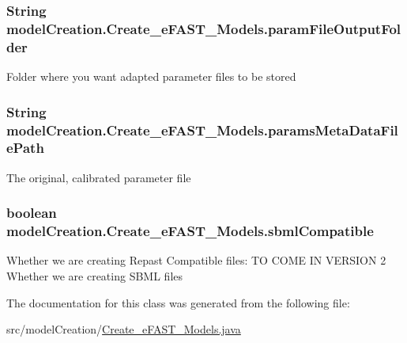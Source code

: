 \subsubsection[{param\+File\+Output\+Folder}]{\setlength{\rightskip}{0pt plus 5cm}String model\+Creation.\+Create\+\_\+e\+F\+A\+S\+T\+\_\+\+Models.\+param\+File\+Output\+Folder}\label{classmodelCreation_1_1Create__eFAST__Models_a24e594a0a8434b90625f7ec3a130a65c}
Folder where you want adapted parameter files to be stored \hypertarget{classmodelCreation_1_1Create__eFAST__Models_acf43f15ebfad126fdc7ce42a33c1b39d}{}
\subsubsection[{params\+Meta\+Data\+File\+Path}]{\setlength{\rightskip}{0pt plus 5cm}String model\+Creation.\+Create\+\_\+e\+F\+A\+S\+T\+\_\+\+Models.\+params\+Meta\+Data\+File\+Path}\label{classmodelCreation_1_1Create__eFAST__Models_acf43f15ebfad126fdc7ce42a33c1b39d}
The original, calibrated parameter file \hypertarget{classmodelCreation_1_1Create__eFAST__Models_aa004bf022772ece1e489a4af00c26096}{}
\subsubsection[{sbml\+Compatible}]{\setlength{\rightskip}{0pt plus 5cm}boolean model\+Creation.\+Create\+\_\+e\+F\+A\+S\+T\+\_\+\+Models.\+sbml\+Compatible}\label{classmodelCreation_1_1Create__eFAST__Models_aa004bf022772ece1e489a4af00c26096}
Whether we are creating Repast Compatible files\+: T\+O C\+O\+M\+E I\+N V\+E\+R\+S\+I\+O\+N 2 Whether we are creating S\+B\+M\+L files 

The documentation for this class was generated from the following file\+:\begin{DoxyCompactItemize}
\item 
src/model\+Creation/\hyperlink{Create__eFAST__Models_8java}{Create\+\_\+e\+F\+A\+S\+T\+\_\+\+Models.\+java}\end{DoxyCompactItemize}
